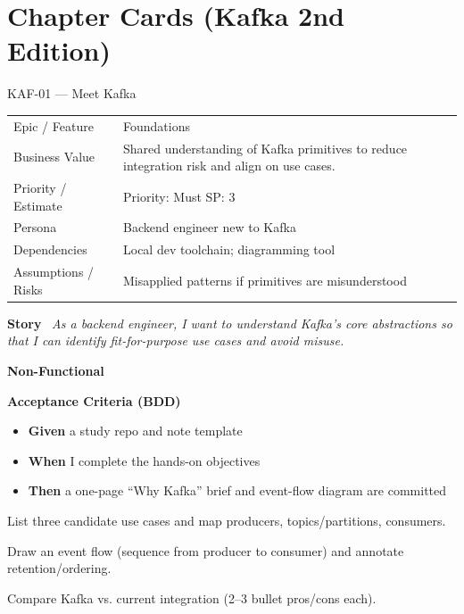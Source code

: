 \documentclass[11pt,a4paper]{article}
\newcommand{\Field}[2]{\textbf{#1}~#2}
\begin{document}

\section*{Chapter Cards (Kafka 2nd Edition)}

\begin{StoryCardBox}{KAF-01 --- Meet Kafka}
\begin{tabularx}{\linewidth}{LY}
 Epic / Feature & Foundations \\
 Business Value & Shared understanding of Kafka primitives to reduce integration risk and align on use cases. \\
 Priority / Estimate & Priority: Must \quad SP: 3 \\
 Persona & Backend engineer new to Kafka \\
 Dependencies & Local dev toolchain; diagramming tool \\
 Assumptions / Risks & Misapplied patterns if primitives are misunderstood \\
\end{tabularx}

\medskip
\Field{Story}{\; \emph{As a backend engineer, I want to understand Kafka's core abstractions so that I can identify fit-for-purpose use cases and avoid misuse.}}

\medskip
\Field{Non-Functional}{\; \; \tagpill{Reliability}\; }

\medskip
\Field{Acceptance Criteria (BDD)}{}
\begin{itemize}[leftmargin=1.2em, itemsep=1pt]
  \item \textbf{Given} a study repo and note template
  \item \textbf{When} I complete the hands-on objectives
  \item \textbf{Then} a one-page ``Why Kafka'' brief and event-flow diagram are committed
\end{itemize}

\begin{TasksBox}
\begin{tasklist}
  \item List three candidate use cases and map producers, topics/partitions, consumers.
  \item Draw an event flow (sequence from producer to consumer) and annotate retention/ordering.
  \item Compare Kafka vs. current integration (2--3 bullet pros/cons each).
\end{tasklist}
\end{TasksBox}
\end{StoryCardBox}
\clearpage
\end{document}
